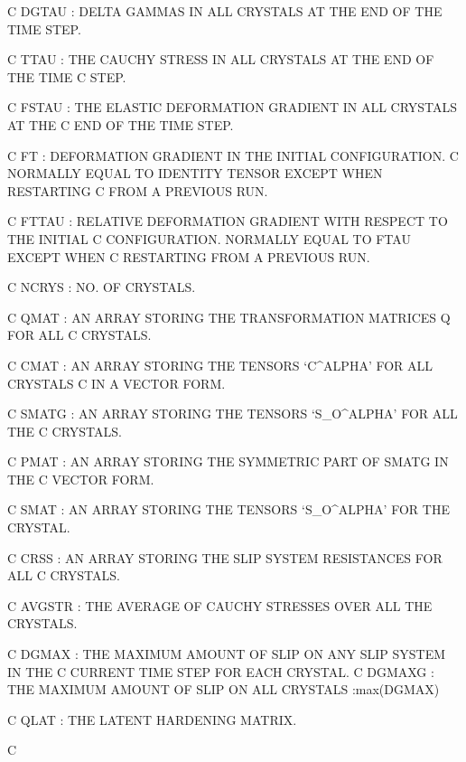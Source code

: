 C   DGTAU       : DELTA GAMMAS IN ALL CRYSTALS AT THE END OF THE TIME STEP.

C   TTAU        : THE CAUCHY STRESS IN ALL CRYSTALS AT THE END OF THE TIME 
C                 STEP.

C   FSTAU       : THE ELASTIC DEFORMATION GRADIENT IN ALL CRYSTALS AT THE 
C                 END OF THE TIME STEP.


C   FT          : DEFORMATION GRADIENT IN THE INITIAL CONFIGURATION. 
C                 NORMALLY EQUAL TO IDENTITY TENSOR EXCEPT WHEN RESTARTING
C                 FROM A PREVIOUS RUN.

C   FTTAU       : RELATIVE DEFORMATION GRADIENT WITH RESPECT TO THE INITIAL
C                 CONFIGURATION. NORMALLY EQUAL TO FTAU EXCEPT WHEN 
C                 RESTARTING FROM A PREVIOUS RUN.

C   NCRYS       : NO. OF CRYSTALS.

C   QMAT        : AN ARRAY STORING THE TRANSFORMATION MATRICES Q FOR ALL
C                 CRYSTALS.

C   CMAT        : AN ARRAY STORING THE TENSORS `C^ALPHA' FOR ALL CRYSTALS 
C                 IN A VECTOR FORM.

C   SMATG       : AN ARRAY STORING THE TENSORS `S_O^ALPHA' FOR ALL THE
C                 CRYSTALS.

C   PMAT        : AN ARRAY STORING THE SYMMETRIC PART OF SMATG IN THE 
C                 VECTOR FORM. 

C   SMAT        : AN ARRAY STORING THE TENSORS `S_O^ALPHA' FOR THE CRYSTAL. 

C   CRSS        : AN ARRAY STORING THE SLIP SYSTEM RESISTANCES FOR ALL
C                 CRYSTALS.

C   AVGSTR      : THE AVERAGE OF CAUCHY STRESSES OVER ALL THE CRYSTALS.

C   DGMAX       : THE MAXIMUM AMOUNT OF SLIP ON ANY SLIP SYSTEM IN THE
C                 CURRENT TIME STEP FOR EACH CRYSTAL.
C   DGMAXG      : THE MAXIMUM AMOUNT OF SLIP ON ALL CRYSTALS :max(DGMAX)

C   QLAT        : THE LATENT HARDENING MATRIX.

C $$$$$$$$$$$$$$$$$$$$$$$$$$$$$$$$$$$$$$$$$$$$$$$$$$$$$$$$$$$$$$$$$$$$$$$$
